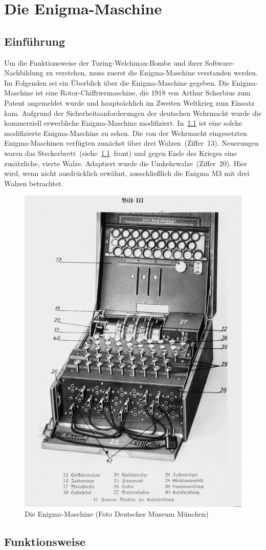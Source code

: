 \chapter{Die Enigma-Maschine}\label{ch:die-enigma}
\section{Einführung}\label{sec:einfuhrung}

Um die Funktionsweise der Turing-Welchman-Bombe und ihrer Software-Nachbildung zu verstehen, muss zuerst die Enigma-Maschine verstanden werden.
Im Folgenden sei ein Überblick über die Enigma-Maschine gegeben.
Die Enigma-Maschine ist eine Rotor-Chiffrier\-maschine, die 1918 von Arthur Scherbius zum Patent angemeldet wurde und hauptsächlich im Zweiten Weltkrieg zum Einsatz kam.
Aufgrund der Sicherheitsanforderungen der deutschen Wehrmacht wurde die kommerziell erwerbliche Enigma-Maschine modifiziert.
In~\cref{fig:enigma_complete} ist eine solche modifizierte Enigma-Maschine zu sehen.
Die von der Wehrmacht eingesetzten Enigma-Maschinen verfügten zunächst über drei Walzen~(Ziffer~13).
Neuerungen waren das Steckerbrett~(siehe~\cref{fig:enigma_complete}~front) und gegen Ende des Krieges eine zusätzliche, vierte Walze. 
Adaptiert wurde die Umkehrwalze~(Ziffer~20).
Hier wird, wenn nicht ausdrücklich erwähnt, ausschließlich die Enigma M3 mit drei Walzen betrachtet.
\nopagebreak
\begin{figure}[htbp]
	\centering
	\includegraphics[width=.42\linewidth]{Enigma/Enigma-plakat}
	\caption{Die Enigma-Maschine (Foto Deutsches Museum München)}
	\label{fig:enigma_complete}
\end{figure}

\newpage

\section{Funktionsweise}\label{sec:funktionsweise}

